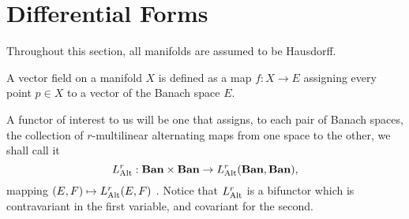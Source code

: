 \section{Differential Forms}

\begin{remark}
Throughout this section, all manifolds are assumed to be Hausdorff.
\end{remark}

\begin{definition}
\label{def:vector-field}
A vector field on a manifold \(X\) is defined as a map \(f: X \to E\) assigning
every point \(p \in X\) to a vector of the Banach space \(E\).
\end{definition}

A functor of interest to us will be one that assigns, to each pair of Banach
spaces, the collection of \(r\)-multilinear alternating maps from one space to
the other, we shall call it
\[
  L_{\operatorname{Alt}}^r: {\textbf{Ban}} \times {\textbf{Ban}} \to L_{\operatorname{Alt}}^r({\textbf{Ban}}, {\textbf{Ban}}),
\]
mapping \((E, F) \mapsto L_{\operatorname{Alt}}^r(E, F)\) .
Notice that \(L_{\operatorname{Alt}}^r\) is a bifunctor which is contravariant in the first
variable, and covariant for the second.

